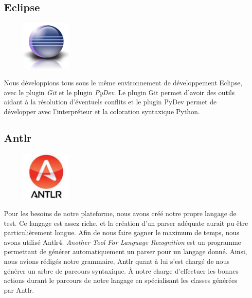 \subsection{Eclipse}
\begin{figure}
	\vspace{-30px}
	\includegraphics[width=2.5cm]{contents/images/logoEclipse.png}
\end{figure}
Nous développions tous sous le même environnement de développement Eclipse, avec le plugin \textit{Git} et le plugin \textit{PyDev}. Le
plugin Git permet d'avoir des outils aidant à la résolution d'éventuels conflits et le plugin PyDev permet de développer avec l'interpréteur
et la coloration syntaxique Python. 
\subsection{Antlr}
\begin{figure}
	\includegraphics[width=2.5cm]{contents/images/antlr.jpg}
\end{figure}
Pour les besoins de notre plateforme, nous avons créé notre propre langage de test. Ce langage est assez riche, et la création d'un parser adéquate aurait pu être particulièrement longue. Afin de nous faire gagner le maximum de temps, nous avons utilisé Antlr4.  \textit{Another Tool For Language Recognition} est un programme permettant de générer automatiquement un parser pour un langage donné. Ainsi, nous avions rédigés notre grammaire, Antlr quant à lui s'est chargé de nous générer un arbre de parcours syntaxique. À notre charge d'effectuer les bonnes actions durant le parcours de notre langage en spécialisant les classes générées par Antlr.

